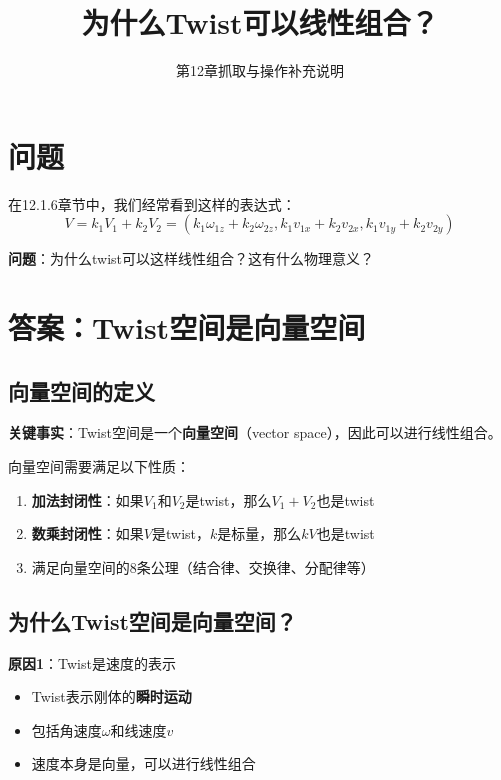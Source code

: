 \documentclass[12pt,a4paper]{article}
\title{为什么Twist可以线性组合？}
\author{第12章抓取与操作补充说明}
\date{}
\begin{document}
\maketitle

\section{问题}

在12.1.6章节中，我们经常看到这样的表达式：
\begin{equation}
V = k_1 V_1 + k_2 V_2 = (k_1 \omega_{1z} + k_2 \omega_{2z}, k_1 v_{1x} + k_2 v_{2x}, k_1 v_{1y} + k_2 v_{2y})
\end{equation}

\textbf{问题}：为什么twist可以这样线性组合？这有什么物理意义？

\section{答案：Twist空间是向量空间}

\subsection{向量空间的定义}

\textbf{关键事实}：Twist空间是一个\textbf{向量空间}（vector space），因此可以进行线性组合。

向量空间需要满足以下性质：
\begin{enumerate}
\item \textbf{加法封闭性}：如果$V_1$和$V_2$是twist，那么$V_1 + V_2$也是twist
\item \textbf{数乘封闭性}：如果$V$是twist，$k$是标量，那么$kV$也是twist
\item 满足向量空间的8条公理（结合律、交换律、分配律等）
\end{enumerate}

\subsection{为什么Twist空间是向量空间？}

\textbf{原因1}：Twist是速度的表示

\begin{itemize}
\item Twist表示刚体的\textbf{瞬时运动}
\item 包括角速度$\omega$和线速度$v$
\item 速度本身是向量，可以进行线性组合
\end{itemize}
\end{document}
